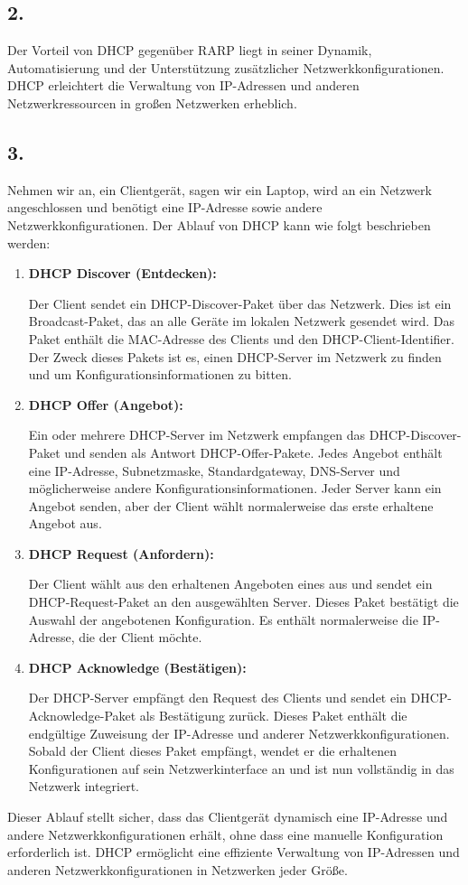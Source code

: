 \documentclass[a4paper]{scrartcl}
\begin{document}
\subsection*{2.}
Der Vorteil von DHCP gegenüber RARP liegt in seiner Dynamik, Automatisierung und der Unterstützung zusätzlicher Netzwerkkonfigurationen. DHCP erleichtert die Verwaltung von IP-Adressen und anderen Netzwerkressourcen in großen Netzwerken erheblich.

\subsection*{3.}
Nehmen wir an, ein Clientgerät, sagen wir ein Laptop, wird an ein Netzwerk angeschlossen und benötigt eine IP-Adresse sowie andere Netzwerkkonfigurationen. Der Ablauf von DHCP kann wie folgt beschrieben werden:
\begin{enumerate}
  \item \textbf{DHCP Discover (Entdecken):}
  
  Der Client sendet ein DHCP-Discover-Paket über das Netzwerk. Dies ist ein Broadcast-Paket, das an alle Geräte im lokalen Netzwerk gesendet wird. Das Paket enthält die MAC-Adresse des Clients und den DHCP-Client-Identifier. Der Zweck dieses Pakets ist es, einen DHCP-Server im Netzwerk zu finden und um Konfigurationsinformationen zu bitten.
  
  \item \textbf{DHCP Offer (Angebot):}
  
  Ein oder mehrere DHCP-Server im Netzwerk empfangen das DHCP-Discover-Paket und senden als Antwort DHCP-Offer-Pakete. Jedes Angebot enthält eine IP-Adresse, Subnetzmaske, Standardgateway, DNS-Server und möglicherweise andere Konfigurationsinformationen. Jeder Server kann ein Angebot senden, aber der Client wählt normalerweise das erste erhaltene Angebot aus.
  
  \item \textbf{DHCP Request (Anfordern):}
  
  Der Client wählt aus den erhaltenen Angeboten eines aus und sendet ein DHCP-Request-Paket an den ausgewählten Server. Dieses Paket bestätigt die Auswahl der angebotenen Konfiguration. Es enthält normalerweise die IP-Adresse, die der Client möchte.
  
  \item \textbf{DHCP Acknowledge (Bestätigen):}
  
  Der DHCP-Server empfängt den Request des Clients und sendet ein DHCP-Acknowledge-Paket als Bestätigung zurück. Dieses Paket enthält die endgültige Zuweisung der IP-Adresse und anderer Netzwerkkonfigurationen. Sobald der Client dieses Paket empfängt, wendet er die erhaltenen Konfigurationen auf sein Netzwerkinterface an und ist nun vollständig in das Netzwerk integriert.
\end{enumerate}
Dieser Ablauf stellt sicher, dass das Clientgerät dynamisch eine IP-Adresse und andere Netzwerkkonfigurationen erhält, ohne dass eine manuelle Konfiguration erforderlich ist. DHCP ermöglicht eine effiziente Verwaltung von IP-Adressen und anderen Netzwerkkonfigurationen in Netzwerken jeder Größe.
\end{document}
